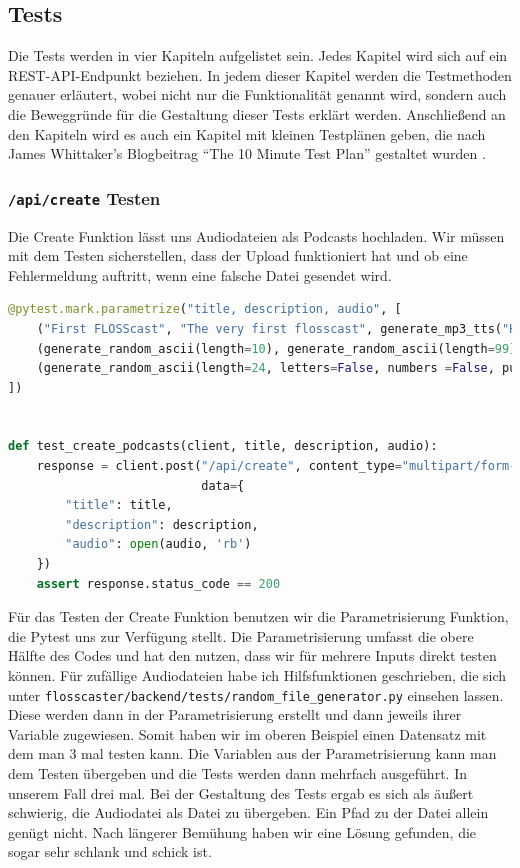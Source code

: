 \documentclass{article}
\begin{document}
\subsection{Tests}
Die Tests werden in vier Kapiteln aufgelistet sein. Jedes Kapitel wird sich auf ein REST-API-Endpunkt beziehen. In jedem dieser Kapitel werden die Testmethoden genauer erläutert, wobei nicht nur die Funktionalität genannt wird, sondern auch die Beweggründe für die Gestaltung dieser Tests erklärt werden. Anschließend an den Kapiteln wird es auch ein Kapitel mit kleinen Testplänen geben, die nach James Whittaker’s Blogbeitrag “The 10 Minute Test Plan” gestaltet wurden \cite{whittaker-test-plan}.

\subsubsection{\texttt{/api/create} Testen}
Die Create Funktion lässt uns Audiodateien als Podcasts hochladen. Wir müssen mit dem Testen sicherstellen, dass der Upload funktioniert hat und ob eine Fehlermeldung auftritt, wenn eine falsche Datei gesendet wird. 

\begin{lstlisting}[language=Python, caption=Test-Implementation von \texttt{/api/create}]
@pytest.mark.parametrize("title, description, audio", [ 
    ("First FLOSScast", "The very first flosscast", generate_mp3_tts("Hello to the very first flosscast episode.", lang="en")), 
    (generate_random_ascii(length=10), generate_random_ascii(length=99), generate_mp3_size(1024)), 
    (generate_random_ascii(length=24, letters=False, numbers =False, punctuation=True), generate_random_ascii(length=240, punctuation=True), generate_mp3_duration(30)) 
]) 
 
 
def test_create_podcasts(client, title, description, audio): 
    response = client.post("/api/create", content_type="multipart/form-data", 
                           data={ 
        "title": title, 
        "description": description, 
        "audio": open(audio, 'rb') 
    }) 
    assert response.status_code == 200 
\end{lstlisting}


Für das Testen der Create Funktion benutzen wir die Parametrisierung Funktion, die Pytest uns zur Verfügung stellt. Die Parametrisierung umfasst die obere Hälfte des Codes und hat den nutzen, dass wir für mehrere Inputs direkt testen können. Für zufällige Audiodateien habe ich Hilfsfunktionen geschrieben, die sich unter \texttt{flosscaster/backend/tests/random\_file\_generator.py} einsehen lassen. Diese werden dann in der Parametrisierung erstellt und dann jeweils ihrer Variable zugewiesen. Somit haben wir im oberen Beispiel einen Datensatz mit dem man 3 mal testen kann.  Die Variablen aus der Parametrisierung kann man dem Testen übergeben und die Tests werden dann mehrfach ausgeführt. In unserem Fall drei mal. Bei der Gestaltung des Tests ergab es sich als äußert schwierig, die Audiodatei als Datei zu übergeben. Ein Pfad zu der Datei allein genügt nicht. Nach längerer Bemühung haben wir eine Lösung gefunden, die sogar sehr schlank und schick ist. 
\end{document}

